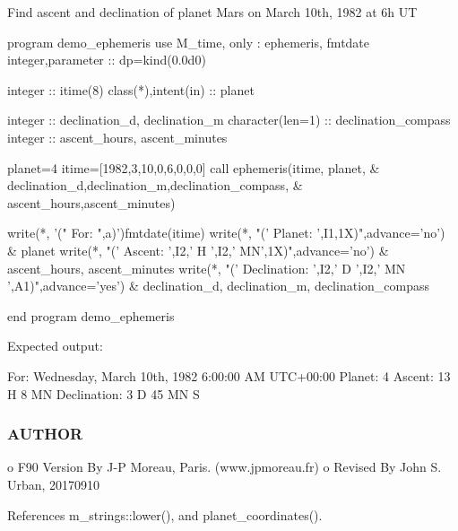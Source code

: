 \begin{DoxyVerb}Find ascent and declination of planet Mars on March 10th, 1982 at 6h UT

  program demo_ephemeris
  use M_time, only : ephemeris, fmtdate
  integer,parameter   :: dp=kind(0.0d0)

  integer             :: itime(8)
  class(*),intent(in) :: planet

  integer            :: declination_d, declination_m
  character(len=1)   :: declination_compass
  integer            :: ascent_hours, ascent_minutes

  planet=4
  itime=[1982,3,10,0,6,0,0,0]
  call ephemeris(itime, planet,                    &
  declination_d,declination_m,declination_compass, &
  ascent_hours,ascent_minutes)

  write(*, '(" For: ",a)')fmtdate(itime)
  write(*, "(' Planet: ',I1,1X)",advance='no')                       &
          planet
  write(*, "(' Ascent: ',I2,' H ',I2,' MN',1X)",advance='no')        &
          ascent_hours, ascent_minutes
  write(*, "(' Declination: ',I2,' D ',I2,' MN ',A1)",advance='yes') &
          declination_d, declination_m, declination_compass

  end program demo_ephemeris

Expected output:

  For: Wednesday, March 10th, 1982 6:00:00 AM UTC+00:00
  Planet: 4  Ascent: 13 H  8 MN  Declination:  3 D 45 MN S
\end{DoxyVerb}


\subsubsection*{A\+U\+T\+H\+OR}

\begin{DoxyVerb}o F90 Version By J-P Moreau, Paris. (www.jpmoreau.fr)
o Revised By John S. Urban, 20170910 \end{DoxyVerb}
 

References m\+\_\+strings\+::lower(), and planet\+\_\+coordinates().

\mbox{\label{namespacem__time_a2cb84c9b8af4f395b76aed76e1431328}} 
